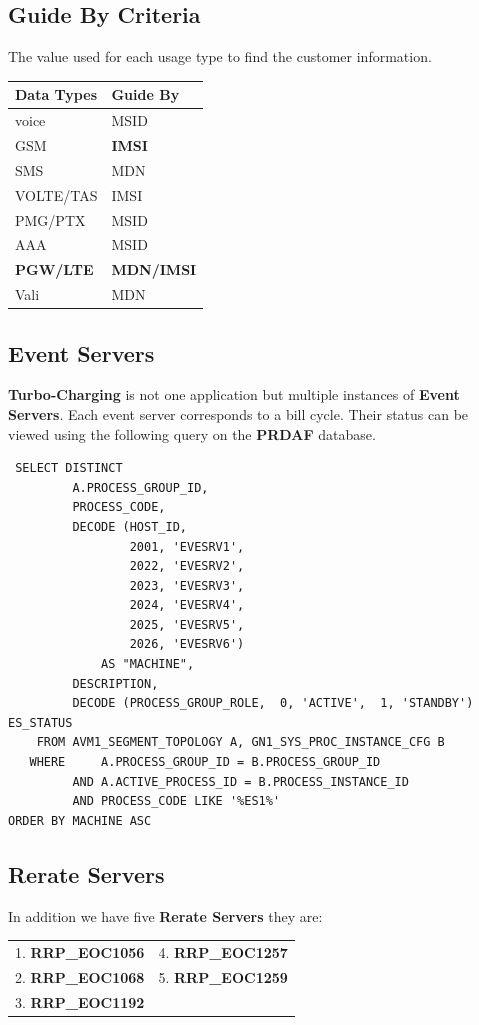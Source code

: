 \documentclass[12pt,twoside]{article}
\begin{document}
\subsection{Guide By Criteria}
\label{sec:orgheadline32}
The value used for each usage type to find the customer information. 
\begin{center}
\begin{tabular}{ll}
\hline
\textbf{Data Types} & \textbf{Guide By}\\
\hline
voice & MSID\\
GSM & \textbf{IMSI}\\
SMS & MDN\\
VOLTE/TAS & IMSI\\
PMG/PTX & MSID\\
AAA & MSID\\
\textbf{PGW/LTE} & \textbf{MDN/IMSI}\\
Vali & MDN\\
\hline
\end{tabular}
\end{center}
\subsection{Event Servers}
\label{sec:orgheadline33}
\textbf{Turbo-Charging} is not one application but multiple instances of \textbf{Event Servers}. Each event server corresponds to a bill cycle. Their status can be viewed using
     the following query on the \textbf{PRDAF} database.
\begin{verbatim}
 SELECT DISTINCT
         A.PROCESS_GROUP_ID,
         PROCESS_CODE,
         DECODE (HOST_ID,
                 2001, 'EVESRV1',
                 2022, 'EVESRV2',
                 2023, 'EVESRV3',
                 2024, 'EVESRV4',
                 2025, 'EVESRV5',
                 2026, 'EVESRV6')
             AS "MACHINE",
         DESCRIPTION,
         DECODE (PROCESS_GROUP_ROLE,  0, 'ACTIVE',  1, 'STANDBY') ES_STATUS
    FROM AVM1_SEGMENT_TOPOLOGY A, GN1_SYS_PROC_INSTANCE_CFG B
   WHERE     A.PROCESS_GROUP_ID = B.PROCESS_GROUP_ID
         AND A.ACTIVE_PROCESS_ID = B.PROCESS_INSTANCE_ID
         AND PROCESS_CODE LIKE '%ES1%'
ORDER BY MACHINE ASC
\end{verbatim}
\subsection{Rerate Servers}
\label{sec:orgheadline34}
In addition we have five \textbf{Rerate Servers} they are:
\begin{center}
\begin{tabular}{ll}
1. \textbf{RRP\_EOC1056} & 4. \textbf{RRP\_EOC1257}\\
2. \textbf{RRP\_EOC1068} & 5. \textbf{RRP\_EOC1259}\\
3. \textbf{RRP\_EOC1192} & \\
\end{tabular}
\end{center}
\end{document}
